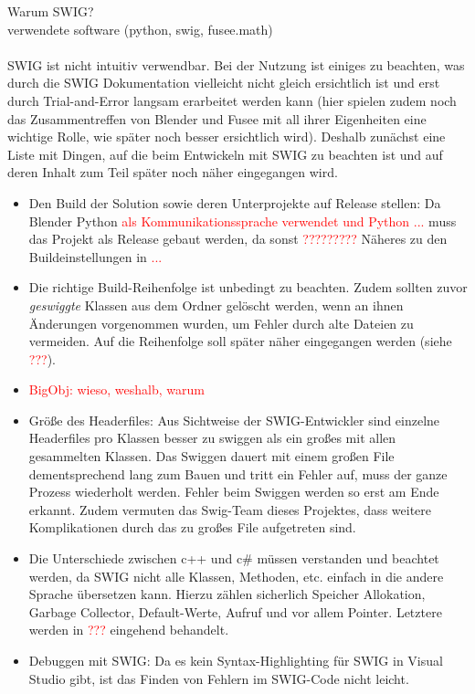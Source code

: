  \label{sec:Umsetzung}


Warum SWIG?\\
verwendete software (python, swig, fusee.math)\\\\

SWIG ist nicht intuitiv verwendbar. Bei der Nutzung ist einiges zu beachten, was durch die SWIG Dokumentation vielleicht nicht gleich ersichtlich ist und erst durch Trial-and-Error langsam erarbeitet werden kann (hier spielen zudem noch das Zusammentreffen von Blender und Fusee mit all ihrer Eigenheiten eine wichtige Rolle, wie später noch besser ersichtlich wird). Deshalb zunächst eine Liste mit Dingen, auf die beim Entwickeln mit SWIG zu beachten ist und auf deren Inhalt zum Teil später noch näher eingegangen wird.

\begin{itemize}
\item Den Build der Solution sowie deren Unterprojekte auf Release stellen: Da Blender Python \textcolor{red}{als Kommunikationssprache verwendet und Python ...} muss das Projekt als Release gebaut werden, da sonst \textcolor{red}{?????????} Näheres zu den Buildeinstellungen in \textcolor{red}{...}
\item Die richtige Build-Reihenfolge ist unbedingt zu beachten. Zudem sollten zuvor \emph{geswiggte} Klassen aus dem Ordner gelöscht werden, wenn an ihnen Änderungen vorgenommen wurden, um Fehler durch alte Dateien zu vermeiden. Auf die Reihenfolge soll später näher eingegangen werden (siehe \textcolor{red}{???}).
\item \textcolor{red}{BigObj: wieso, weshalb, warum}
\item Größe des Headerfiles: Aus Sichtweise der SWIG-Entwickler sind einzelne Headerfiles pro Klassen besser zu swiggen als ein großes mit allen gesammelten Klassen. Das Swiggen dauert mit einem großen File dementsprechend lang zum Bauen und tritt ein Fehler auf, muss der ganze Prozess wiederholt werden. Fehler beim Swiggen werden so erst am Ende erkannt. Zudem vermuten das Swig-Team dieses Projektes, dass weitere Komplikationen durch das zu großes File aufgetreten sind. 
\item Die Unterschiede zwischen c++ und c\# müssen verstanden und beachtet werden, da SWIG nicht alle Klassen, Methoden, etc. einfach in die andere Sprache übersetzen kann. Hierzu zählen sicherlich Speicher Allokation, Garbage Collector, Default-Werte, Aufruf und vor allem Pointer. Letztere werden in \textcolor{red}{???} eingehend behandelt. \item Debuggen mit SWIG: Da es kein Syntax-Highlighting für SWIG in Visual Studio gibt, ist das Finden von Fehlern im SWIG-Code nicht leicht.  
\end{itemize}


